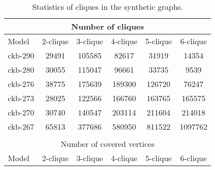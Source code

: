 \documentclass[sigconf]{acmart}
\begin{document}
\begin{table}[tbp]
\centering
\caption{Statistics of cliques in the synthetic graphs.}
\label{tab:clique-count}
\begin{tabular}{cccccc}
\multicolumn{6}{c}{Number of cliques}                                                                                                                       \\ \hline
\multicolumn{1}{|l|}{Model}        & \multicolumn{1}{c|}{2-clique}       & \multicolumn{1}{c|}{3-clique}       & \multicolumn{1}{c|}{4-clique}       & \multicolumn{1}{c|}{5-clique}       & \multicolumn{1}{c|}{6-clique}       \\ \hline \hline
\multicolumn{1}{|l|}{ckb-290} & \multicolumn{1}{c|}{29491} & \multicolumn{1}{c|}{105585} & \multicolumn{1}{c|}{82617}  & \multicolumn{1}{c|}{31919}  & \multicolumn{1}{c|}{14354} \\ \hline
\multicolumn{1}{|l|}{ckb-280} & \multicolumn{1}{c|}{30055} & \multicolumn{1}{c|}{115047} & \multicolumn{1}{c|}{96661}  & \multicolumn{1}{c|}{33735}  & \multicolumn{1}{c|}{9539} \\ \hline
\multicolumn{1}{|l|}{ckb-276} & \multicolumn{1}{c|}{38775} & \multicolumn{1}{c|}{175639} & \multicolumn{1}{c|}{189300} & \multicolumn{1}{c|}{126720} & \multicolumn{1}{c|}{76247} \\ \hline
\multicolumn{1}{|l|}{ckb-273} & \multicolumn{1}{c|}{28025} & \multicolumn{1}{c|}{122566} & \multicolumn{1}{c|}{166760} & \multicolumn{1}{c|}{163765} & \multicolumn{1}{c|}{165575} \\ \hline
\multicolumn{1}{|l|}{ckb-270} & \multicolumn{1}{c|}{30740} & \multicolumn{1}{c|}{140547} & \multicolumn{1}{c|}{203114} & \multicolumn{1}{c|}{211604} & \multicolumn{1}{c|}{214018} \\ \hline
\multicolumn{1}{|l|}{ckb-267} & \multicolumn{1}{c|}{65813} & \multicolumn{1}{c|}{377686} & \multicolumn{1}{c|}{580950} & \multicolumn{1}{c|}{811522} & \multicolumn{1}{c|}{1097762} \\ \hline
\\
\multicolumn{6}{c}{Number of covered vertices}                                                                                                                       \\ \hline
\multicolumn{1}{|l|}{Model}        & \multicolumn{1}{c|}{2-clique}       & \multicolumn{1}{c|}{3-clique}       & \multicolumn{1}{c|}{4-clique}       & \multicolumn{1}{c|}{5-clique}       & \multicolumn{1}{c|}{6-clique}       \\ \hline \hline

\end{tabular}
\end{table}
\end{document}
